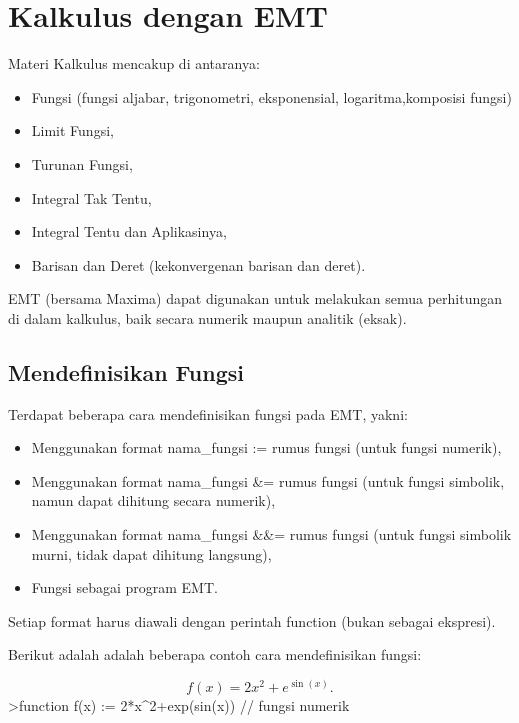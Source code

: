 \documentclass[
]{book}
\author{}
\date{}
\begin{document}
\frontmatter

\mainmatter
\chapter{Kalkulus dengan EMT}\label{kalkulus-dengan-emt}

Materi Kalkulus mencakup di antaranya:

\begin{itemize}
\item
  Fungsi (fungsi aljabar, trigonometri, eksponensial, logaritma,komposisi fungsi)
\item
  Limit Fungsi,
\item
  Turunan Fungsi,
\item
  Integral Tak Tentu,
\item
  Integral Tentu dan Aplikasinya,
\item
  Barisan dan Deret (kekonvergenan barisan dan deret).
\end{itemize}

EMT (bersama Maxima) dapat digunakan untuk melakukan semua perhitungan di dalam kalkulus, baik secara numerik maupun analitik (eksak).

\section{Mendefinisikan Fungsi}\label{mendefinisikan-fungsi}

Terdapat beberapa cara mendefinisikan fungsi pada EMT, yakni:

\begin{itemize}
\item
  Menggunakan format nama\_fungsi := rumus fungsi (untuk fungsi numerik),
\item
  Menggunakan format nama\_fungsi \&= rumus fungsi (untuk fungsi simbolik, namun dapat dihitung secara numerik),
\item
  Menggunakan format nama\_fungsi \&\&= rumus fungsi (untuk fungsi simbolik murni, tidak dapat dihitung langsung),
\item
  Fungsi sebagai program EMT.
\end{itemize}

Setiap format harus diawali dengan perintah function (bukan sebagai ekspresi).

Berikut adalah adalah beberapa contoh cara mendefinisikan fungsi:

\[f(x)=2x^2+e^{\sin(x)}.\]\textgreater function f(x) := 2*x\^{}2+exp(sin(x)) // fungsi numerik
\end{document}
